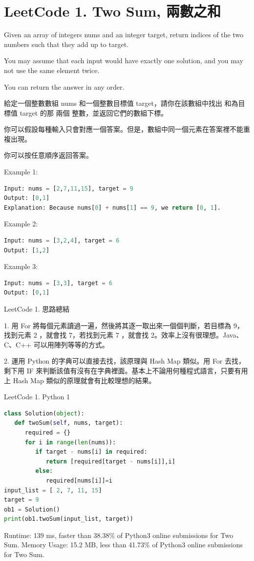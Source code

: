 \documentclass[10pt,UTF8]{ctexart}
\begin{document}
\section{LeetCode 1. Two Sum, 兩數之和}

Given an array of integers nums and an integer target, return indices of the two numbers such that they add up to target.

You may assume that each input would have exactly one solution, and you may not use the same element twice.

You can return the answer in any order.

給定一個整數數組 nums 和一個整數目標值 target，請你在該數組中找出 和為目標值 target  的那 兩個 整數，並返回它們的數組下標。

你可以假設每種輸入只會對應一個答案。但是，數組中同一個元素在答案裡不能重複出現。

你可以按任意順序返回答案。

Example 1:
\begin{lstlisting}[language={python}]
Input: nums = [2,7,11,15], target = 9
Output: [0,1]
Explanation: Because nums[0] + nums[1] == 9, we return [0, 1].
\end{lstlisting}

Example 2:
\begin{lstlisting}[language={python}]
Input: nums = [3,2,4], target = 6
Output: [1,2]
\end{lstlisting}

Example 3:
\begin{lstlisting}[language={python}]
Input: nums = [3,3], target = 6
Output: [0,1]
\end{lstlisting}

LeetCode 1. 思路總結

1. 用 For 將每個元素讀過一遍，然後將其逐一取出來一個個判斷，若目標為 9，找到元素 2 ，就會找 7，若找到元素 7 ，就會找 2。效率上沒有很理想。Java、C、C++ 可以用陣列等等的方式。

2. 運用 Python 的字典可以直接去找，該原理與 Hash Map 類似。用 For 去找，剩下用 IF 來判斷該值有沒有在字典裡面。基本上不論用何種程式語言，只要有用上 Hash Map 類似的原理就會有比較理想的結果。

LeetCode 1. Python 1

\begin{lstlisting}[language={python}]
class Solution(object):
   def twoSum(self, nums, target):
      required = {}
      for i in range(len(nums)):
         if target - nums[i] in required:
            return [required[target - nums[i]],i]
         else:
            required[nums[i]]=i
input_list = [ 2, 7, 11, 15]
target = 9
ob1 = Solution()
print(ob1.twoSum(input_list, target))
\end{lstlisting}
Runtime: 139 ms, faster than 38.38\% of Python3 online submissions for Two Sum.
Memory Usage: 15.2 MB, less than 41.73\% of Python3 online submissions for Two Sum.
\end{document}

